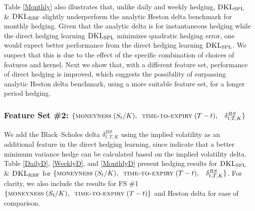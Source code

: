 \documentclass[letterpaper,12pt,titlepage,oneside,final]{book}
\numberwithin{equation}{section}
\theoremstyle{definition}
\newcommand{\DKLs}{\bf\textsc{DKL}_{\text{SPL}}}
\newcommand{\DKLg}{\bf\textsc{DKL}_{\text{RBF}}}
\begin{document}
Table \ref{Monthly} also illustrates that, unlike daily and weekly hedging, $\DKLs$ \& $\DKLg$ slightly underperform the analytic Heston delta benchmark  for monthly hedging.
Given that the analytic delta is for instantaneous hedging while the direct hedging learning $\DKLs$ minimizes quadratic hedging error, one would expect better performance from the direct hedging learning $\DKLs$. We suspect that this is due to the effect of the specific combination of choices of features and kernel. Next we show that,  with a different feature set,   performance of direct hedging is improved, which suggests the possibility of surpassing  analytic Heston delta benchmark, using a more suitable feature set, for a longer period hedging.


\subsubsection{Feature Set \#2: $ \{\textsc{moneyness} \;(S_t/K),\;\;\textsc{time-to-expiry} \;(T-t) ,\;\;~ \delta^{BS}_{t,T,K}\}$}
We add the Black–Scholes delta $\delta^{BS}_{t,T,K}$ using the implied volatility as an additional feature in the direct hedging learning, since \citet{hulloptimal} indicate that a better minimum  variance hedge can be calculated based on the implied volatility delta.  Table \ref{DailyD}, \ref{WeeklyD}, and \ref{MonthlyD}
present hedging results for  $\DKLs$ \& $\DKLg$ for  $\{\textsc{moneyness} \;(S_t/K),\;\;\textsc{time-to-expiry} \;(T-t) ,\;\;~ \delta^{BS}_{t,T,K}\}$. For clarity, we also include the results for FS \#1 $\{\textsc{moneyness} \;(S_t/K),\;\;\textsc{time-to-expiry} \;(T-t) \}$ and Heston delta for ease of comparison.
\end{document}
